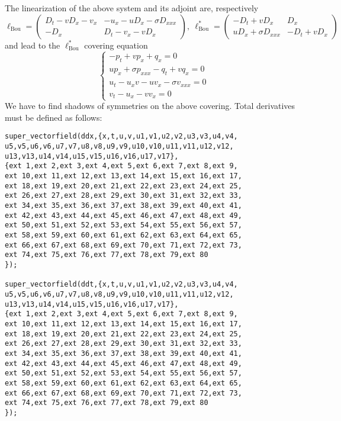 The linearization of the above system and its adjoint are, respectively
\begin{displaymath}
  \ell_{\text{Bou}}=
  \begin{pmatrix}
    D_t-vD_x-v_x & -u_x-uD_x-\sigma D_{xxx}\\
    -D_x & D_t-v_x-vD_x
  \end{pmatrix},\ 
  \ell^*_{\text{Bou}}=
  \begin{pmatrix}
    -D_t+vD_x & D_x\\
    uD_x+\sigma D_{xxx} & -D_t+vD_x
  \end{pmatrix}
\end{displaymath}
and lead to the $\ell^*_{\text{Bou}}$ covering equation
\begin{displaymath}
  \label{cdiffeq:2}
  \left\{
  \begin{array}{l}
    -p_t+vp_x+q_x=0\\
    up_x+\sigma p_{xxx}-q_t+vq_x=0\\
  u_t-u_xv-uv_x-\sigma v_{xxx}=0\\
  v_t-u_x-vv_x=0
\end{array}
\right.
\end{displaymath}
We have to find shadows of symmetries on the above covering.
Total derivatives must be defined as follows:
\begin{verbatim}
super_vectorfield(ddx,{x,t,u,v,u1,v1,u2,v2,u3,v3,u4,v4,
u5,v5,u6,v6,u7,v7,u8,v8,u9,v9,u10,v10,u11,v11,u12,v12,
u13,v13,u14,v14,u15,v15,u16,v16,u17,v17},
{ext 1,ext 2,ext 3,ext 4,ext 5,ext 6,ext 7,ext 8,ext 9,
ext 10,ext 11,ext 12,ext 13,ext 14,ext 15,ext 16,ext 17,
ext 18,ext 19,ext 20,ext 21,ext 22,ext 23,ext 24,ext 25,
ext 26,ext 27,ext 28,ext 29,ext 30,ext 31,ext 32,ext 33,
ext 34,ext 35,ext 36,ext 37,ext 38,ext 39,ext 40,ext 41,
ext 42,ext 43,ext 44,ext 45,ext 46,ext 47,ext 48,ext 49,
ext 50,ext 51,ext 52,ext 53,ext 54,ext 55,ext 56,ext 57,
ext 58,ext 59,ext 60,ext 61,ext 62,ext 63,ext 64,ext 65,
ext 66,ext 67,ext 68,ext 69,ext 70,ext 71,ext 72,ext 73,
ext 74,ext 75,ext 76,ext 77,ext 78,ext 79,ext 80
});

super_vectorfield(ddt,{x,t,u,v,u1,v1,u2,v2,u3,v3,u4,v4,
u5,v5,u6,v6,u7,v7,u8,v8,u9,v9,u10,v10,u11,v11,u12,v12,
u13,v13,u14,v14,u15,v15,u16,v16,u17,v17},
{ext 1,ext 2,ext 3,ext 4,ext 5,ext 6,ext 7,ext 8,ext 9,
ext 10,ext 11,ext 12,ext 13,ext 14,ext 15,ext 16,ext 17,
ext 18,ext 19,ext 20,ext 21,ext 22,ext 23,ext 24,ext 25,
ext 26,ext 27,ext 28,ext 29,ext 30,ext 31,ext 32,ext 33,
ext 34,ext 35,ext 36,ext 37,ext 38,ext 39,ext 40,ext 41,
ext 42,ext 43,ext 44,ext 45,ext 46,ext 47,ext 48,ext 49,
ext 50,ext 51,ext 52,ext 53,ext 54,ext 55,ext 56,ext 57,
ext 58,ext 59,ext 60,ext 61,ext 62,ext 63,ext 64,ext 65,
ext 66,ext 67,ext 68,ext 69,ext 70,ext 71,ext 72,ext 73,
ext 74,ext 75,ext 76,ext 77,ext 78,ext 79,ext 80
});
\end{verbatim}
